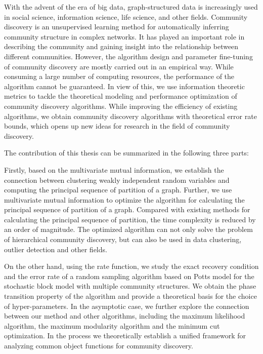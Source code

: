 \begin{abstract*}
  With the advent of the era of big data, graph-structured data is increasingly used in
  social science, information science, life science, and other fields.
  Community discovery is an unsupervised learning method for automatically inferring community structure
  in complex networks.
  It has played an important role in describing the community and gaining insight into the relationship between different communities.
  However, the algorithm design and parameter fine-tuning of community discovery are mostly carried out in an empirical way.
  While consuming a large number of computing resources,
  the performance of the algorithm cannot be guaranteed.
  In view of this,
  we use information theoretic metrics to tackle the theoretical modeling and performance optimization of community discovery algorithms.
  While improving the efficiency of existing algorithms, we obtain community discovery algorithms with theoretical error rate bounds,
  which opens up new ideas for research in the field of community discovery.

  The contribution of this thesis can be summarized in the following three parts:

  Firstly, based on the multivariate mutual information,
  we establish the connection between clustering weakly independent random variables and computing the principal sequence of partition
  of a graph.
  Further, we use multivariate mutual information to optimize the algorithm for calculating the principal sequence of partition of a graph.
  Compared with existing methods for calculating the principal sequence of partition,
  the time complexity is reduced by an order of magnitude.
  The optimized algorithm can not only solve the problem of hierarchical community discovery, but can also be used in data clustering, outlier detection and other fields.

  On the other hand, using the rate function,
  we study the exact recovery condition and the error rate of a random sampling algorithm based on Potts model
  for the stochastic block model with multiple community structures.
  We obtain the phase transition property of the algorithm and provide a theoretical basis
  for the choice of hyper-parameters.
  In the asymptotic case, we further explore the connection between our method and other algorithms, including the maximum likelihood algorithm, the maximum modularity algorithm and the minimum cut optimization.
  In the process we theoretically establish a unified framework for analyzing common object functions for community discovery.


\end{abstract*}
